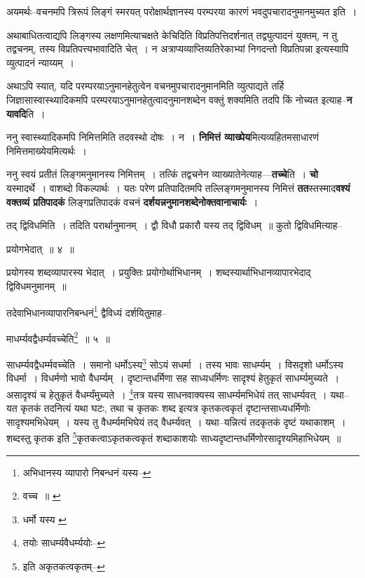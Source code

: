 \documentclass[article,12pt,a4paper]{memoir}
\begin{document}
	  \pstart अयमर्थः--वचनमपि त्रिरूपं लिङ्गं स्मरयत् परोक्षार्थज्ञानस्य परम्परया कारणं भवदुपचारादनुमानमुच्यत इति ।
	\pend
      

	  \pstart अथाबाधितत्वाद्यपि लिङ्गस्य लक्षणमित्याचक्षते केचिदिति विप्रतिपत्तिदर्शनात् तद्व्युत्पादनं युक्तम्, न तु तद्वचनम्, तस्य विप्रतिपत्त्यभावादिति चेत् । न अत्राप्यव्याप्तिव्यतिरेकाभ्यां निगदन्तो विप्रतिपन्ना इत्यस्यापि व्युत्पादनं न्याय्यम् ।
	\pend
      

	  \pstart अथाऽपि स्यात्, यदि परम्परयाऽनुमानहेतुत्वेन वचनमुपचारादनुमानमिति व्युत्पाद्यते तर्हि जिज्ञासास्वास्थ्यादिकमपि परम्परयाऽनुमानहेतुत्वादनुमानशब्देन वक्तुं शक्यमिति तदपि किं नोच्यत इत्याह--\textbf{न यावदि}ति ।
	\pend
      

	  \pstart ननु स्वास्थ्यादिकमपि निमित्तमिति तदवस्थो दोषः । न । \textbf{निमित्तं व्याख्पेय}मित्यव्यहितमसाधारणं निमित्तमाख्येयमित्यर्थः ।
	\pend
      

	  \pstart ननु स्वयं प्रतीतं लिङ्गमनुमानस्य निमित्तम् । तत्किं तद्वचनेन व्याख्यातेनेत्याह—\textbf{तच्चे}ति । \textbf{चो} यस्मादर्थे । वाशब्दो विकल्पार्थः । यतः परेण प्रतिपादितमपि तल्लिङ्गमनुमानस्य निमित्तं \textbf{तत}स्तस्माद\textbf{वश्यं वक्तव्यं प्र}\leavevmode{}\textbf{तिपादकं} लिङ्गप्रतिपादकं वचनं \textbf{दर्शयन्ननुमानशब्देनोक्तवानाचार्यः} ।
	\pend
	  \bigskip
	  \begingroup
	

	  \pstart तद् द्विविधमिति । तदिति परार्थानुमानम् । द्वौ विधौ प्रकारौ यस्य तद् द्विविधम् ॥ कुतो द्विविधमित्याह--
	\pend
       
	  \bigskip
	  \begingroup
	

	  \pstart प्रयोगभेदात् ॥ ४ ॥
	\pend
      
	  \endgroup
	 

	  \pstart प्रयोगस्य शब्दव्यापारस्य भेदात् । प्रयुक्तिः प्रयोगोर्थाभिधानम् । शब्दस्यार्थाभिधानव्यापारभेदाद् द्विविधमनुमानम् ॥
	\pend
       

	  \pstart तदेवाभिधानव्यापारनिबन्धनं\footnote{अभिधानस्य व्यापारो निबन्धनं यस्य--\cite{dp-msD-n}} द्वैविध्यं दर्शयितुमाह--
	\pend
       
	  \bigskip
	  \begingroup
	

	  \pstart माधर्म्यवद्वैधर्म्यवच्चेति\footnote{वच्च ॥ \cite{dp-msC}} ॥ ५ ॥
	\pend
      
	  \endgroup
	 

	  \pstart साधर्म्यवद्वैधर्म्मवच्चेति । समानो धर्मोऽस्य\footnote{धर्मो यस्य \cite{dp-msC} \cite{dp-msA} \cite{dp-edP} \cite{dp-edH} \cite{dp-edE} \cite{dp-edN}} सोऽयं सधर्मा । तस्य भावः साधर्म्यम् । विसदृशो धर्मोऽस्य विधर्मा । विधर्मणो भावो वैधर्म्यम् । दृष्टान्तधर्मिणा सह साध्यधर्मिणः सादृश्यं हेतुकृतं साधर्म्यमुच्यते । असादृश्यं च हेतुकृतं वैधर्म्यंमुच्यते । \footnote{तयोः साधर्म्यवैधर्म्ययोः--\cite{dp-msD-n}}\-तत्र यस्य साधनवाक्यस्य साधर्म्यमभिधेयं तत् साधर्म्यवत् । यथा--यत कृतकं तदनित्यं यथा घटः, तथा च कृतकः शब्द इत्यत्र कृतकत्वकृतं दृष्टान्तसाध्यधर्मिणोः सादृश्यमभिधेयम् । यस्य तु वैधर्म्यमभिघेयं तद् वैधर्म्यवत् । यथा--यन्नित्यं तदकृतकं दृष्टं यथाकाशम् । शब्दस्तु कृतक इति \footnote{इति अकृतकत्वकृतम्--\cite{dp-msC}}\-कृतकत्वाऽकृतकत्वकृतं शब्दाकाशयोः साध्यदृष्टान्तधर्मिणोरसादृश्यमिहाभिधेयम् ॥
	\pend
       
\end{document}
